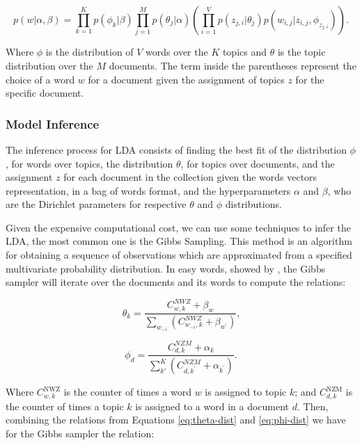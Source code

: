 	\begin{equation}
		\label{eq:generative-lda}
		p(w|\alpha, \beta) = \prod_{k=1}^{K} p(\phi_{k}|\beta) \prod_{j=1}^{M} p(\theta_{j}|\alpha) \left( \prod_{i=1}^{V}p(z_{j,i}|\theta_{j}) p(w_{i,j}|z_{i,j},\phi_{z_{j,i}})  \right) \text{.}
	\end{equation}

	Where $\phi$ is the distribution of $V$ words over the $K$ topics and $\theta$ is the topic distribution over the $M$ documents. The term inside the parentheses represent the choice of a word $w$ for a document given the assignment of topics $z$ for the specific document.
	
	\subsubsection{Model Inference}
	
	The inference process for LDA consists of finding the best fit of the distribution $\phi$, for words over topics, the distribution $\theta$, for topics over documents, and the assignment $z$ for each document in the collection given the words vectors representation, in a bag of words format, and the hyperparameters $\alpha$ and $\beta$, who are the Dirichlet parameters for respective $\theta$ and $\phi$ distributions.
	
	Given the expensive computational cost, we can use some techniques to infer the LDA, the most common one is the Gibbs Sampling. This method is an algorithm for obtaining a sequence of observations which are approximated from a specified multivariate probability distribution. In easy words, showed by , the Gibbs sampler will iterate over the documents and its words to compute the relations:

	\begin{equation}
		\label{eq:theta-dist}
		\theta_{k} = \frac{C_{w,k}^{NWZ} + \beta_{w}} {\sum_{w_{-i}} \left(C_{w_{-i},k}^{NWZ} + \beta_{w^{'}} \right)} \text{,}
	\end{equation}
	
	\begin{equation}
		\label{eq:phi-dist}
		\phi_{d} = \frac{C_{d,k}^{NZM} + \alpha_{k}} {\sum_{k'}^{K} \left(C_{d,k^{'}}^{NZM} + \alpha_{k^{'}} \right)} \text{.}
	\end{equation}

	Where $C_{w,k}^{\text{NWZ}}$ is the counter of times a word $w$ is assigned to topic $k$; and $C_{d,k}^{\text{NZM}}$ is the counter of times a topic $k$ is assigned to a word in a document $d$. Then, combining the relations from Equations \ref{eq:theta-dist} and \ref{eq:phi-dist} we have for the Gibbs sampler the relation: 
	
